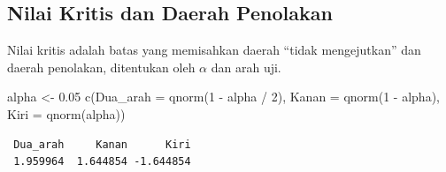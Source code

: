 \documentclass[
  indonesian,
  letterpaper,
]{book}
\newenvironment{Shaded}{\begin{snugshade}}{\end{snugshade}}
\newcommand{\AttributeTok}[1]{\textcolor[rgb]{0.40,0.45,0.13}{#1}}
\newcommand{\DecValTok}[1]{\textcolor[rgb]{0.68,0.00,0.00}{#1}}
\newcommand{\FloatTok}[1]{\textcolor[rgb]{0.68,0.00,0.00}{#1}}
\newcommand{\FunctionTok}[1]{\textcolor[rgb]{0.28,0.35,0.67}{#1}}
\newcommand{\NormalTok}[1]{\textcolor[rgb]{0.00,0.23,0.31}{#1}}
\newcommand{\OtherTok}[1]{\textcolor[rgb]{0.00,0.23,0.31}{#1}}
\newcommand{\SpecialCharTok}[1]{\textcolor[rgb]{0.37,0.37,0.37}{#1}}
\begin{document}
\subsection{Nilai Kritis dan Daerah
Penolakan}\label{nilai-kritis-dan-daerah-penolakan}

Nilai kritis adalah batas yang memisahkan daerah ``tidak mengejutkan''
dan daerah penolakan, ditentukan oleh \(\alpha\) dan arah uji.

\begin{Shaded}
\begin{Highlighting}[]
\NormalTok{alpha }\OtherTok{\textless{}{-}} \FloatTok{0.05}
\FunctionTok{c}\NormalTok{(}\AttributeTok{Dua\_arah =} \FunctionTok{qnorm}\NormalTok{(}\DecValTok{1} \SpecialCharTok{{-}}\NormalTok{ alpha }\SpecialCharTok{/} \DecValTok{2}\NormalTok{), }\AttributeTok{Kanan =} \FunctionTok{qnorm}\NormalTok{(}\DecValTok{1} \SpecialCharTok{{-}}\NormalTok{ alpha), }\AttributeTok{Kiri =} \FunctionTok{qnorm}\NormalTok{(alpha))}
\end{Highlighting}
\end{Shaded}

\begin{verbatim}
 Dua_arah     Kanan      Kiri 
 1.959964  1.644854 -1.644854 
\end{verbatim}
\end{document}
